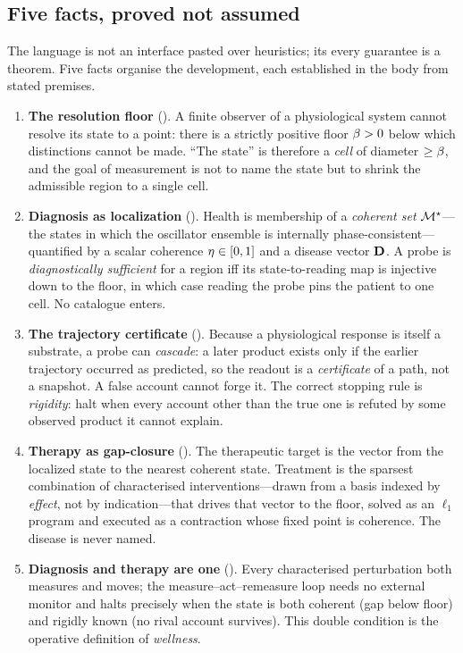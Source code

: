 \subsection{Five facts, proved not assumed}

The language is not an interface pasted over heuristics; its every guarantee
is a theorem. Five facts organise the development, each established in the
body from stated premises.

\begin{enumerate}[leftmargin=1.5em,itemsep=3pt]
\item \textbf{The resolution floor} (). A finite observer of a
physiological system cannot resolve its state to a point: there is a strictly
positive floor $\beta>0$ below which distinctions cannot be made. ``The state''
is therefore a \emph{cell} of diameter $\ge\beta$, and the goal of measurement
is not to name the state but to shrink the admissible region to a single cell.
\item \textbf{Diagnosis as localization} ().
Health is membership of a \emph{coherent set} $\mathcal{M}^{\star}$---the states in which the
oscillator ensemble is internally phase-consistent---quantified by a scalar
coherence $\eta\in[0,1]$ and a disease vector $\mathbf{D}$. A probe is
\emph{diagnostically sufficient} for a region iff its state-to-reading map is
injective down to the floor, in which case reading the probe pins the patient
to one cell. No catalogue enters.
\item \textbf{The trajectory certificate} (). Because a
physiological response is itself a substrate, a probe can \emph{cascade}: a
later product exists only if the earlier trajectory occurred as predicted, so
the readout is a \emph{certificate} of a path, not a snapshot. A false account
cannot forge it. The correct stopping rule is \emph{rigidity}: halt when every
account other than the true one is refuted by some observed product it cannot
explain.
\item \textbf{Therapy as gap-closure} (). The therapeutic
target is the vector from the localized state to the nearest coherent state.
Treatment is the sparsest combination of characterised interventions---drawn
from a basis indexed by \emph{effect}, not by indication---that drives that
vector to the floor, solved as an $\ell_1$ program and executed as a
contraction whose fixed point is coherence. The disease is never named.
\item \textbf{Diagnosis and therapy are one} (). Every
characterised perturbation both measures and moves; the measure--act--remeasure
loop needs no external monitor and halts precisely when the state is both
coherent (gap below floor) and rigidly known (no rival account survives). This
double condition is the operative definition of \emph{wellness}.
\end{enumerate}

